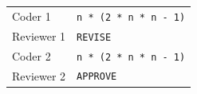 \begin{tabular}{@{}ll@{}}
Coder 1 & \texttt{n * (2 * n * n - 1)} \\
Reviewer 1 & \texttt{REVISE} \\
Coder 2 & \texttt{n * (2 * n * n - 1)} \\
Reviewer 2 & \texttt{APPROVE} \\
\end{tabular}
